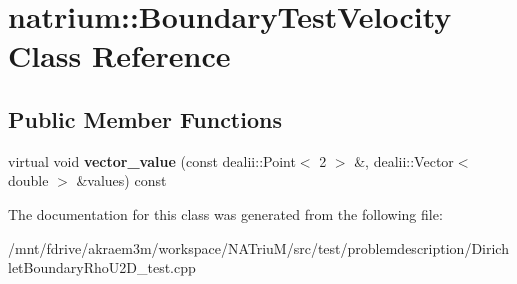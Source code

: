 \hypertarget{classnatrium_1_1BoundaryTestVelocity}{
\section{natrium::BoundaryTestVelocity Class Reference}
\label{classnatrium_1_1BoundaryTestVelocity}
}
\subsection*{Public Member Functions}
\begin{DoxyCompactItemize}
\item 
\hypertarget{classnatrium_1_1BoundaryTestVelocity_a79517bd2413986c38f4e944faea57a48}{
virtual void {\bfseries vector\_\-value} (const dealii::Point$<$ 2 $>$ \&, dealii::Vector$<$ double $>$ \&values) const }
\label{classnatrium_1_1BoundaryTestVelocity_a79517bd2413986c38f4e944faea57a48}

\end{DoxyCompactItemize}


The documentation for this class was generated from the following file:\begin{DoxyCompactItemize}
\item 
/mnt/fdrive/akraem3m/workspace/NATriuM/src/test/problemdescription/DirichletBoundaryRhoU2D\_\-test.cpp\end{DoxyCompactItemize}
